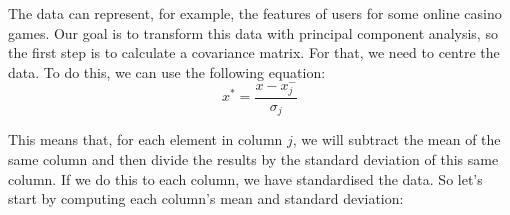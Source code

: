 \documentclass[a4,12pt,twosided,openany]{memoir}
\begin{document}
\begin{center}

\end{center}
\par 
\indent
The data can represent, for example, the features of users for some online casino games. Our goal is to transform this data with principal component analysis, so the first step is to calculate a covariance matrix. For that, we need to centre the data. To do this, we can use the following equation:
\begin{equation}\label{eq:std}
x^{*} =  \frac{x-x^-_j}{\sigma_j}
\end{equation}
\par 
\indent
This means that, for each element in column $j$, we will subtract the mean of the same column and then divide the results by the standard deviation of this same column. If we do this to each column, we have standardised the data. So let’s start by computing each column’s mean and standard deviation:
\end{document}
